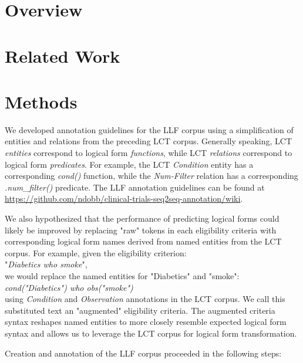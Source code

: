 \documentclass[../main.tex]{subfiles}
\begin{document}
\section{Overview}


\section{Related Work}


\section{Methods}

We developed annotation guidelines for the LLF corpus using a simplification of entities and relations from the preceding LCT corpus\cite{dobbins2022leaf}. Generally speaking, LCT \textit{entities} correspond to logical form \textit{functions}, while LCT \textit{relations} correspond to logical form \textit{predicates}. For example, the LCT \textit{Condition} entity has a corresponding \textit{cond()} function, while the \textit{Num-Filter} relation has a corresponding \textit{.num\_filter()} predicate. The LLF annotation guidelines can be found at \url{https://github.com/ndobb/clinical-trials-seq2seq-annotation/wiki}.

We also hypothesized that the performance of predicting logical forms could likely be improved by replacing "raw" tokens in each eligibility criteria with corresponding logical form names derived from named entities from the LCT corpus. For example, given the eligibility criterion: \\

"\textit{Diabetics who smoke}", \\

\noindent we would replace the named entities for "Diabetics" and "smoke": \\ 

\textit{cond("Diabetics") who obs("smoke")} \\

\noindent using \textit{Condition} and \textit{Observation} annotations in the LCT corpus. We call this substituted text an "augmented" eligibility criteria. The augmented criteria syntax reshapes named entities to more closely resemble expected logical form syntax and allows us to leverage the LCT corpus for logical form transformation.

Creation and annotation of the LLF corpus proceeded in the following steps:
\end{document}
